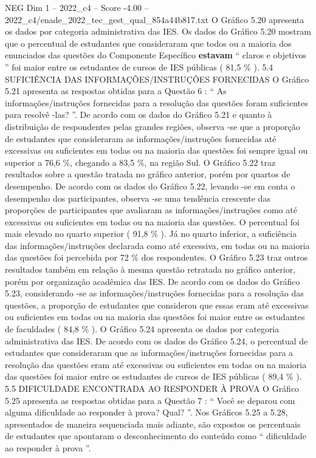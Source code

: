 \begin{textsample}{NEG Dim 1 – 2022\_c4 – Score -4.00 – 2022\_c4/enade\_2022\_tec\_gest\_qual\_854a44b817.txt}
O Gráfico 5.20 apresenta os dados por categoria administrativa das IES.
Os dados do Gráfico 5.20 mostram que o percentual de estudantes que consideraram que todos ou a maioria dos enunciados das questões do Componente Específico \textbf{estavam} “ claros e objetivos ” foi maior entre os estudantes de cursos de IES públicas ( 81,5 \% ). 5.4 SUFICIÊNCIA DAS INFORMAÇÕES/INSTRUÇÕES FORNECIDAS O Gráfico 5.21 apresenta as respostas obtidas para a Questão 6 : “ As informações/instruções fornecidas para a resolução das questões foram suficientes para resolvê -las? ”.
De acordo com os dados do Gráfico 5.21 e quanto à distribuição de respondentes pelas grandes regiões, observa -se que a proporção de estudantes que consideraram as informações/instruções fornecidas até excessivas ou suficientes em todas ou na maioria das questões foi sempre igual ou superior a 76,6 \%, chegando a 83,5 \%, na região Sul.
O Gráfico 5.22 traz resultados sobre a questão tratada no gráfico anterior, porém por quartos de desempenho.
De acordo com os dados do Gráfico 5.22, levando -se em conta o desempenho dos participantes, observa -se uma tendência crescente das proporções de participantes que avaliaram as informações/instruções como até excessivas ou suficientes em todas ou na maioria das questões.
O percentual foi mais elevado no quarto superior ( 91,8 \% ).
Já no quarto inferior, a suficiência das informações/instruções declarada como até excessiva, em todas ou na maioria das questões foi percebida por 72 \% dos respondentes.
O Gráfico 5.23 traz outros resultados também em relação à mesma questão retratada no gráfico anterior, porém por organização acadêmica das IES.
De acordo com os dados do Gráfico 5.23, considerando -se as informações/instruções fornecidas para a resolução das questões, a proporção de estudantes que considerou que essas eram até excessivas ou suficientes em todas ou na maioria das questões foi maior entre os estudantes de faculdades ( 84,8 \% ).
O Gráfico 5.24 apresenta os dados por categoria administrativa das IES.
De acordo com os dados do Gráfico 5.24, o percentual de estudantes que consideraram que as informações/instruções fornecidas para a resolução das questões eram até excessivas ou suficientes em todas ou na maioria das questões foi maior entre os estudantes de cursos de IES públicas ( 89,4 \% ). 5.5 DIFICULDADE ENCONTRADA AO RESPONDER À PROVA O Gráfico 5.25 apresenta as respostas obtidas para a Questão 7 : “ Você se deparou com alguma dificuldade ao responder à prova?
Qual? ”.
Nos Gráficos 5.25 a 5.28, apresentados de maneira sequenciada mais adiante, são expostos os percentuais de estudantes que apontaram o desconhecimento do conteúdo como “ dificuldade ao responder à prova ”.

\end{textsample}
